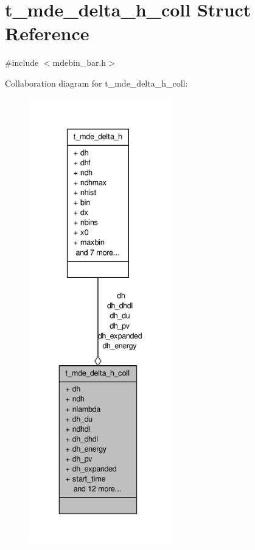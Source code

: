 \hypertarget{structt__mde__delta__h__coll}{\section{t\-\_\-mde\-\_\-delta\-\_\-h\-\_\-coll \-Struct \-Reference}
\label{structt__mde__delta__h__coll}
}


{\ttfamily \#include $<$mdebin\-\_\-bar.\-h$>$}



\-Collaboration diagram for t\-\_\-mde\-\_\-delta\-\_\-h\-\_\-coll\-:
\nopagebreak
\begin{figure}[H]
\begin{center}
\leavevmode
\includegraphics[height=550pt]{structt__mde__delta__h__coll__coll__graph}
\end{center}
\end{figure}
